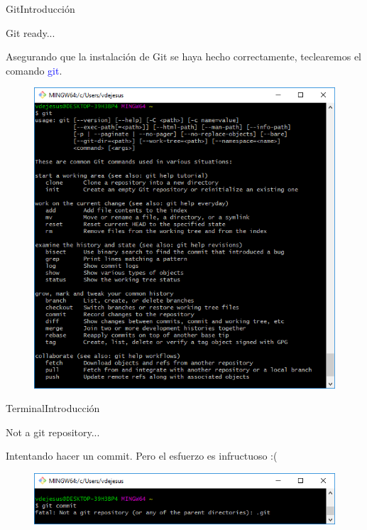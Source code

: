 \documentclass[10pt]{beamer}
\begin{document}
\begin{frame}{Git}{Introducción}

\begin{block}{Git ready...}

Asegurando que la instalación de Git se haya hecho correctamente, teclearemos el comando \textcolor{blue}{git}.

\begin{figure}[h!]
\centering
\includegraphics [scale=0.35]{gitback}
\label{fig:git}
\end{figure}

\end{block}

\end{frame}

\begin{frame}{Terminal}{Introducción}

\begin{block}{Not a git repository...}

Intentando hacer un commit. Pero el esfuerzo es infructuoso :(


\begin{figure}[h!]
\centering
\includegraphics [scale=0.55]{notgit}
\label{fig:notgit}
\end{figure}

\end{block}

\end{frame}
\end{document}
